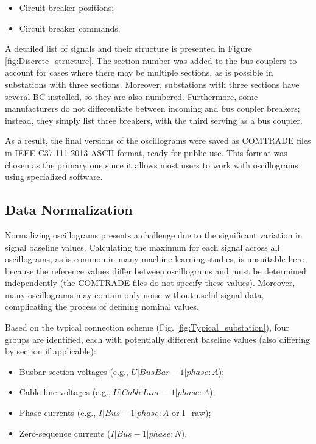\documentclass{article}
\begin{document}
\begin{itemize}
    \item Circuit breaker positions;
    \item Circuit breaker commands.
\end{itemize}

A detailed list of signals and their structure is presented in Figure \ref{fig:Discrete_structure}. The section number was added to the bus couplers to account for cases where there may be multiple sections, as is possible in substations with three sections. Moreover, substations with three sections have several BC installed, so they are also numbered. Furthermore, some manufacturers do not differentiate between incoming and bus coupler breakers; instead, they simply list three breakers, with the third serving as a bus coupler.

As a result, the final versions of the oscillograms were saved as COMTRADE files in IEEE C37.111-2013 ASCII format, ready for public use. This format was chosen as the primary one since it allows most users to work with oscillograms using specialized software.

\subsection*{Data Normalization}

Normalizing oscillograms presents a challenge due to the significant variation in signal baseline values. Calculating the maximum for each signal across all oscillograms, as is common in many machine learning studies, is unsuitable here because the reference values differ between oscillograms and must be determined independently (the COMTRADE files do not specify these values). Moreover, many oscillograms may contain only noise without useful signal data, complicating the process of defining nominal values.

Based on the typical connection scheme (Fig. \ref{fig:Typical_substation}), four groups are identified, each with potentially different baseline values (also differing by section if applicable):

\begin{itemize}
    \item Busbar section voltages (e.g., \(U | BusBar-1 | phase: A\));
    \item Cable line voltages (e.g., \(U | CableLine-1 | phase: A\));
    \item Phase currents (e.g., \(I | Bus-1 | phase: A\) or I\_raw); 
    \item Zero-sequence currents (\(I | Bus-1 | phase: N\)). 
\end{itemize}
\end{document}
